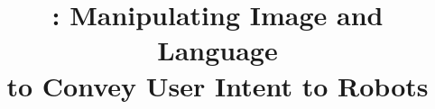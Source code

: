 \documentclass[sigconf]{acmart}
\begin{document}
\title[\projname]{\projname: Manipulating Image and Language \\ to Convey User Intent to Robots}






\maketitle










%
%





\end{document}
